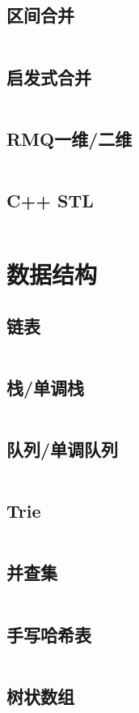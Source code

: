 \documentclass[a4paper,12pt]{article}
\begin{document}
\subsection{区间合并}
\inputminted[breaklines, linenos]{c++}{basic/interval_union.cc}
\subsection{启发式合并}
\inputminted[breaklines, linenos]{c++}{basic/heuristic_merge.cc}
\subsection{RMQ一维/二维}
\inputminted[breaklines, linenos]{c++}{basic/rmq.cc}
\subsection{C++ STL}
\inputminted[breaklines, linenos]{md}{basic/stl.cc}

\newpage
\section{数据结构}
\subsection{链表}
\inputminted[breaklines, linenos]{c++}{ds/list.cc}
\subsection{栈/单调栈}
\inputminted[breaklines, linenos]{c++}{ds/stack.cc}
\subsection{队列/单调队列}
\inputminted[breaklines, linenos]{c++}{ds/queue.cc}
\subsection{Trie}
\inputminted[breaklines, linenos]{c++}{ds/trie.cc}
\subsection{并查集}
\inputminted[breaklines, linenos]{c++}{ds/dsu.cc}
\subsection{手写哈希表}
\inputminted[breaklines, linenos]{c++}{ds/hash.cc}
\subsection{树状数组}
\inputminted[breaklines, linenos]{c++}{ds/tree_array.cc}
\end{document}
